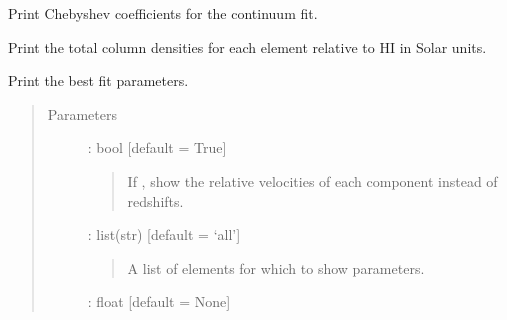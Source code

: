 \documentclass[letterpaper,10pt,english]{sphinxmanual}
\begin{document}
\begin{fulllineitems}
\begin{fulllineitems}
\begin{quote}
\begin{description}
\end{description}\end{quote}

\end{fulllineitems}


\begin{fulllineitems}
\label{\detokenize{api:VoigtFit.DataSet.print_cont_parameters}}
Print Chebyshev coefficients for the continuum fit.

\end{fulllineitems}


\begin{fulllineitems}
\label{\detokenize{api:VoigtFit.DataSet.print_metallicity}}
Print the total column densities for each element relative to
HI in Solar units.

\end{fulllineitems}


\begin{fulllineitems}
\label{\detokenize{api:VoigtFit.DataSet.print_results}}
Print the best fit parameters.
\begin{quote}\begin{description}
\item[{Parameters}] \leavevmode
{} : bool   {[}default = True{]}
\begin{quote}

If , show the relative velocities of each component instead of redshifts.
\end{quote}

 : list(str)   {[}default = ‘all’{]}
\begin{quote}

A list of elements for which to show parameters.
\end{quote}

 : float   {[}default = None{]}
\begin{quote}


\end{quote}
\end{description}
\end{quote}
\end{fulllineitems}
\end{fulllineitems}
\end{document}

